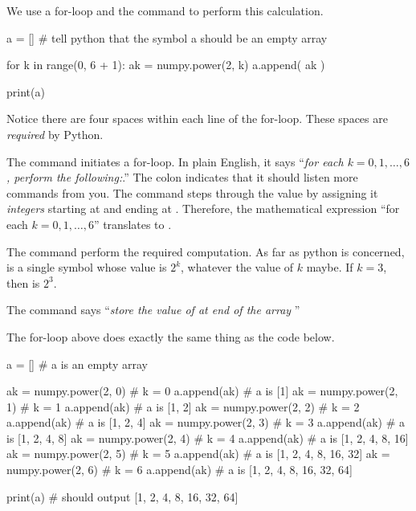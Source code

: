 \documentclass[../main.tex]{subfiles}
\begin{document}
\begin{enumerate}
    We use a for-loop and the  command to perform this calculation.

    \begin{pythoncode}
a = []        # tell python that the symbol a should be an empty array

for k in range(0, 6 + 1):  
    ak = numpy.power(2, k)
    a.append( ak )

print(a)
    \end{pythoncode}
    \faExclamationTriangle{} Notice there are four spaces within each line of the for-loop. These spaces are \emph{required} by Python.

    The command  initiates a for-loop. In plain English, it says ``\emph{for each \(k = 0, 1, \ldots, 6\), perform the following:}.''  The colon indicates that it should listen more commands from you.   The  command steps through the value  by assigning it \emph{integers} starting at  and ending at .  Therefore, the mathematical expression ``for each \(k = 0, 1, \ldots, 6\)'' translates to .

    The command  perform the required computation. As far as python is concerned,  is a single symbol whose value is \(2^{k}\), whatever the value of \(k\) maybe.  If \(k = 3\), then  is \(2^{3}\). 

    The command  says ``\emph{store the value of  at end of the array }''

    The for-loop above does exactly the same thing as the code below.
    \begin{pythoncode}
a = []                  # a is an empty array

ak = numpy.power(2, 0)  # k = 0
a.append(ak)            # a is [1]
ak = numpy.power(2, 1)  # k = 1
a.append(ak)            # a is [1, 2]
ak = numpy.power(2, 2)  # k = 2
a.append(ak)            # a is [1, 2, 4]
ak = numpy.power(2, 3)  # k = 3
a.append(ak)            # a is [1, 2, 4, 8]
ak = numpy.power(2, 4)  # k = 4
a.append(ak)            # a is [1, 2, 4, 8, 16]
ak = numpy.power(2, 5)  # k = 5
a.append(ak)            # a is [1, 2, 4, 8, 16, 32]
ak = numpy.power(2, 6)  # k = 6
a.append(ak)            # a is [1, 2, 4, 8, 16, 32, 64]

print(a)                # should output [1, 2, 4, 8, 16, 32, 64]
    \end{pythoncode}

\end{enumerate}
\end{document}
